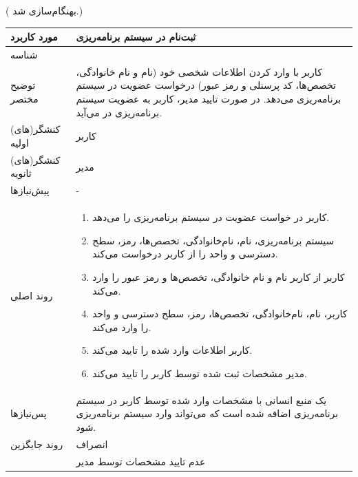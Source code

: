 ({\color{red} بهنگام‌سازی شد.})
\begin{table}[H]
	\centering
	\begin{tabular}{|p{3cm}|p{10cm}|}
		\hline
		مورد کاربرد & ثبت‌نام در سیستم برنامه‌ریزی  \\
		\hline
		شناسه & 
		\stepcounter{usecase_ID}
		\arabic{usecase_ID} \\
		\hline
		توضیح مختصر & کاربر با وارد کردن اطلاعات شخصی خود (نام و نام خانوادگی، تخصص‌ها، کد پرسنلی و رمز عبور) درخواست عضویت در سیستم برنامه‌ریزی می‌دهد. در صورت تایید مدیر، کاربر به عضویت سیستم برنامه‌ریزی در می‌آید. \\
		\hline
		کنشگر(های) اولیه & کاربر \\
		\hline
		کنشگر(های) ثانویه & مدیر \\
		\hline
		پیش‌نیازها & - \\
		\hline
		
		روند اصلی &
		\begin{enumerate}[topsep=0cm,leftmargin=0.5cm]
			\item کاربر در خواست عضویت در سیستم برنامه‌ریزی را می‌دهد.
			\item سیستم برنامه‌ریزی، نام، نام‌خانوادگی، تخصص‌ها، رمز، سطح دسترسی و واحد را از کاربر درخواست می‌کند.
			\item کاربر از کاربر نام و نام خانوادگی، تخصص‌ها و رمز عبور را وارد می‌کند.
			\item کاربر، نام، نام‌خانوادگی، تخصص‌ها، رمز، سطح دسترسی و واحد را وارد می‌کند.
			\item کاربر اطلاعات وارد شده را تایید می‌کند.
			\item مدیر مشخصات ثبت شده توسط کاربر را تایید می‌کند.
		\end{enumerate} \\
		
		\hline
		پس‌نیازها & یک منبع انسانی با مشخصات وارد شده توسط کاربر در سیستم برنامه‌ریزی اضافه شده است که می‌تواند وارد سیستم برنامه‌ریزی شود. \\
		\hline
		روند جایگزین & انصراف \\
		& عدم تایید مشخصات توسط مدیر \\
		\hline
	\end{tabular}
\end{table}

